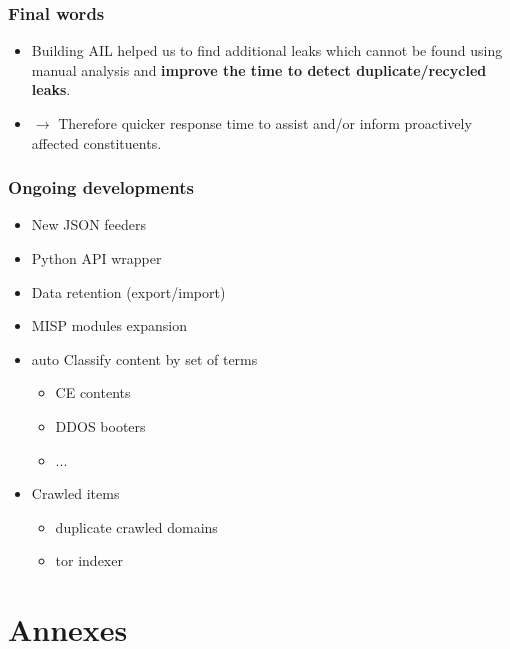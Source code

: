 \documentclass{beamer}
\begin{document}
\begin{frame}
   \frametitle{Final words}
   \begin{itemize}
        \item Building AIL helped us to find additional leaks which cannot be found using manual analysis and {\bf improve the time to detect duplicate/recycled leaks}.
            \vskip0.5cm
        \item[] $\rightarrow$ Therefore quicker response time to assist and/or inform proactively affected constituents.
   \end{itemize}
\end{frame}



\begin{frame}
    \frametitle{Ongoing developments}
        \begin{itemize}
        	\item New JSON feeders
            \item Python API wrapper
            \item Data retention (export/import)
            \item MISP modules expansion
            \item auto Classify content by set of terms
            \begin{itemize}
            	\item CE contents
            	\item DDOS booters
            	\item ...
            \end{itemize}
            \item Crawled items
            \begin{itemize}
            	\item duplicate crawled domains
            	\item tor indexer
            \end{itemize}
        \end{itemize}
\end{frame}


\section{Annexes}


\end{document}
